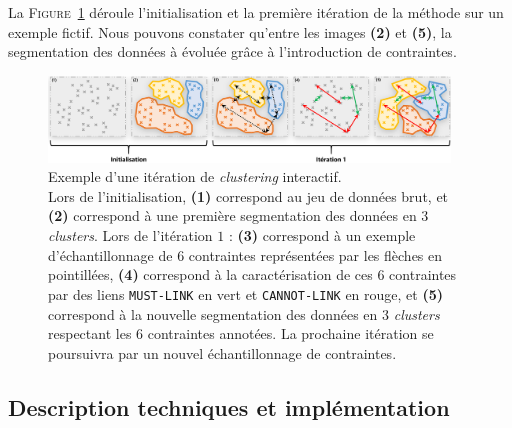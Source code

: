 		\begin{leftBarExamples}
			La \textsc{Figure~\ref{figure:3.2.2-DESCRIPTION-THEORIQUE-DETAILLEE-EXEMPLE}} déroule l'initialisation et la première itération de la méthode sur un exemple fictif.
			Nous pouvons constater qu'entre les images \textbf{(2)} et \textbf{(5)}, la segmentation des données à évoluée grâce à l'introduction de contraintes.
		
			\begin{figure}[H]
				\centering
				\includegraphics[width=0.95\textwidth]{figures/example-iteration-clustering-interatif}
				\caption{
					Exemple d'une itération de \textit{clustering} interactif. \\
					Lors de l'initialisation,
					\textbf{(1)} correspond au jeu de données brut,
					et \textbf{(2)} correspond à une première segmentation des données en $3$ \textit{clusters}.
					Lors de l'itération $1$ :
					\textbf{(3)} correspond à un exemple d'échantillonnage de $6$ contraintes représentées par les flèches en pointillées,
					\textbf{(4)} correspond à la caractérisation de ces $6$ contraintes par des liens \texttt{MUST-LINK} en vert et \texttt{CANNOT-LINK} en rouge,
					et \textbf{(5)} correspond à la nouvelle segmentation des données en $3$ \textit{clusters} respectant les $6$ contraintes annotées.
					La prochaine itération se poursuivra par un nouvel échantillonnage de contraintes.
				}
				\label{figure:3.2.2-DESCRIPTION-THEORIQUE-DETAILLEE-EXEMPLE}
			\end{figure}
		\end{leftBarExamples}
	
	
	\subsection{Description techniques et implémentation}
	\label{section:3.2.3-DESCRIPTION-TECHNIQUE-IMPLEMENTATION}
	
